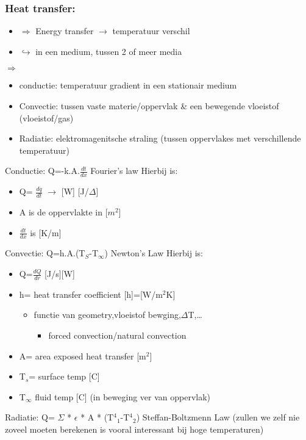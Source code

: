\documentclass[12pt]{article}
\begin{document}
\subsubsection{Heat transfer:}
\begin{itemize}
    \item[] $\Rightarrow$ Energy transfer $\rightarrow$ temperatuur verschil
    \item[] $\hookrightarrow$ in een medium, tussen 2 of meer media
\end{itemize}
$\Rightarrow$\begin{itemize}
    \item conductie: temperatuur gradient in een stationair medium 
    \item Convectie: tussen vaste materie/oppervlak \& een bewegende vloeistof (vloeistof/gas)
    \item Radiatie: elektromagenitsche straling (tussen oppervlakes met verschillende temperatuur)
\end{itemize}
Conductie: Q=-k.A.$\frac{dt}{dx}$ Fourier's law 
Hierbij is:\begin{itemize}
    \item Q= $\frac{dq}{dt}$ $\rightarrow$ [W] [J/$\Delta$] 
    \item A is de oppervlakte in [$m^2$]
    \item $\frac{dt}{dx}$ is [K/m]
\end{itemize}
Convectie: Q=h.A.(T${_S}$-T${_\infty}$) Newton's Law
Hierbij is:\begin{itemize}
    \item Q=$\frac{dQ}{dr}$ [J/s][W]
    \item h= heat transfer coefficient [h]=[W/m$^2$K]\begin{itemize}
        \item functie van geometry,vloeistof bewging,$\Delta$T,\dots\begin{itemize}
            \item forced convection/natural convection
        \end{itemize}
    \end{itemize}
    \item A= area exposed heat transfer [m$^2$]
    \item T$_s$= surface temp [\degree C] 
    \item T$_\infty$ fluid temp [\degree C] (in beweging ver van oppervlak)
\end{itemize}
Radiatie: Q= $\Sigma$ * $\epsilon$ * A * (T${^4}$$_1$-T${^4}$$_2$) Steffan-Boltzmenn Law (zullen we zelf nie zoveel moeten berekenen is vooral interessant bij hoge temperaturen)
\end{document}
